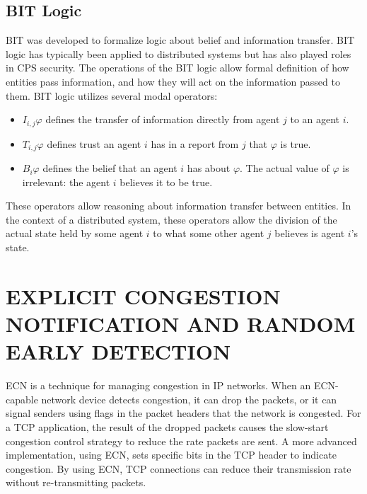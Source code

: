 \subsection{BIT Logic}


\ac{BIT} was developed to formalize logic about belief and information transfer.
\ac{BIT} logic has typically been applied to distributed systems but has also played roles in \ac{CPS} security.
The operations of the \ac{BIT} logic allow formal definition of how entities pass information, and how they will act on the information passed to them.
\ac{BIT} logic utilizes several modal operators:

\begin{itemize}
\item $I_{i,j} \varphi$ defines the transfer of information directly from agent $j$ to an agent $i$. 
\item $T_{i,j} \varphi$ defines trust an agent $i$ has in a report from $j$ that $\varphi$ is true.
\item $B_i \varphi$ defines the belief that an agent $i$ has about $\varphi$. The actual value of $\varphi$ is irrelevant: the agent $i$ believes it to be true.
\end{itemize}

These operators allow reasoning about information transfer between entities.
In the context of a distributed system, these operators allow the division of the actual state held by some agent $i$ to what some other agent $j$ believes is agent $i$'s state.

\section{EXPLICIT CONGESTION NOTIFICATION AND RANDOM EARLY DETECTION}

\ac{ECN} is a technique for managing congestion in IP networks. 
When an \ac{ECN}-capable network device detects congestion, it can drop the packets, or it can signal senders using flags in the packet headers that the network is congested.
For a TCP application, the result of the dropped packets causes the slow-start congestion control strategy to reduce the rate packets are sent.
A more advanced implementation, using \ac{ECN}, sets specific bits in the TCP header to indicate congestion.
By using \ac{ECN}, TCP connections can reduce their transmission rate without re-transmitting packets.

